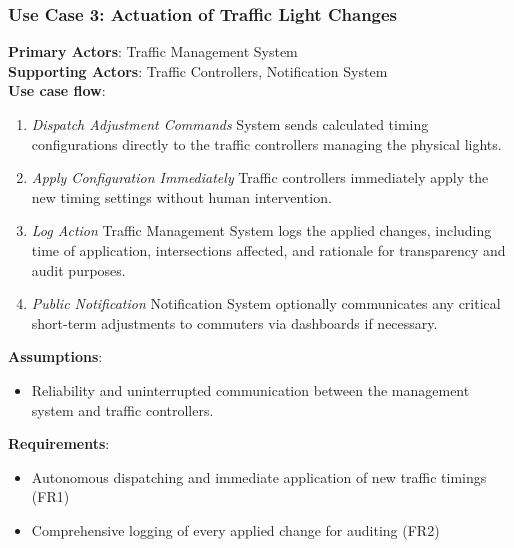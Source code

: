 \documentclass[a4paper,12pt]{article}
\begin{document}
\subsubsection*{Use Case 3: Actuation of Traffic Light Changes}
\textbf{Primary Actors}: Traffic Management System \\
\textbf{Supporting Actors}: Traffic Controllers, Notification System \\
\textbf{Use case flow}: 
\begin{enumerate}
    \item \textit{Dispatch Adjustment Commands} System sends calculated timing configurations directly to the traffic controllers managing the physical lights.
    \item \textit{Apply Configuration Immediately} Traffic controllers immediately apply the new timing settings without human intervention.
    \item \textit{Log Action} Traffic Management System logs the applied changes, including time of application, intersections affected, and rationale for transparency and audit purposes.
    \item \textit{Public Notification} Notification System optionally communicates any critical short-term adjustments to commuters via dashboards if necessary.
\end{enumerate}
\textbf{Assumptions}: 
\begin{itemize}
    \item Reliability and uninterrupted communication between the management system and traffic controllers.
\end{itemize}
\textbf{Requirements}: 
\begin{itemize}
    \item Autonomous dispatching and immediate application of new traffic timings (FR1)
    \item Comprehensive logging of every applied change for auditing (FR2) 
\end{itemize}

\newpage
\end{document}
